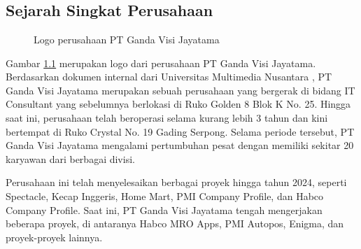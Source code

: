 \chapter{\babDua}

\section{Sejarah Singkat Perusahaan}

\begin{figure}[H]
    \centering
    \caption{Logo perusahaan PT Ganda Visi Jayatama}
    \label{concise-logo}
\end{figure}

Gambar \ref{concise-logo} merupakan logo dari perusahaan PT Ganda Visi Jayatama. Berdasarkan dokumen internal dari Universitas Multimedia Nusantara \cite{umn2023}, PT Ganda Visi Jayatama merupakan sebuah perusahaan yang bergerak di bidang IT Consultant yang sebelumnya berlokasi di Ruko Golden 8 Blok K No. 25. Hingga saat ini, perusahaan 
telah beroperasi selama kurang lebih 3 tahun dan kini bertempat di Ruko Crystal No. 19 
Gading Serpong. Selama periode tersebut, PT Ganda Visi Jayatama mengalami pertumbuhan 
pesat dengan memiliki sekitar 20 karyawan dari berbagai divisi. 

Perusahaan ini telah menyelesaikan berbagai proyek hingga tahun 2024, seperti 
Spectacle, Kecap Inggeris, Home Mart, PMI Company Profile, dan Habco Company 
Profile. Saat ini, PT Ganda Visi Jayatama tengah mengerjakan beberapa proyek, di 
antaranya Habco MRO Apps, PMI Autopos, Enigma, dan proyek-proyek lainnya.



